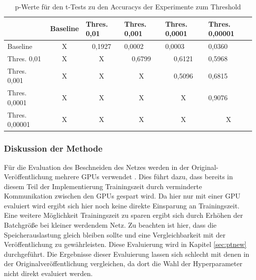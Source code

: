  \begin{table}[]
\caption{p-Werte für den t-Tests zu den Accuracys der Experimente zum Threshold}
\begin{tabular}{l|c|c|c|c|l|}
\cline{2-6}
                                     & \multicolumn{1}{l|}{Baseline} & \multicolumn{1}{l|}{Thres. 0,01} & \multicolumn{1}{l|}{Thres. 0,001} & \multicolumn{1}{l|}{Thres. 0,0001} & Thres. 0,00001                 \\ \hline
\multicolumn{1}{|l|}{Baseline}       & X                             & 0,1927                           & \multicolumn{1}{l|}{0,0002}       & \multicolumn{1}{l|}{0,0003}        & 0,0360                         \\ \hline
\multicolumn{1}{|l|}{Thres. 0,01}    & X                             & X                                & \cellcolor[HTML]{FE0000}0,6799    & \cellcolor[HTML]{FE0000}0,6121     & \cellcolor[HTML]{FE0000}0,5968 \\ \hline
\multicolumn{1}{|l|}{Thres. 0,001}   & X                             & X                                & X                                 & \cellcolor[HTML]{FE0000}0,5096     & \cellcolor[HTML]{FE0000}0,6815 \\ \hline
\multicolumn{1}{|l|}{Thres. 0,0001}  & X                             & X                                & X                                 & X                                  & \cellcolor[HTML]{FE0000}0,9076 \\ \hline
\multicolumn{1}{|l|}{Thres. 0,00001} & X                             & X                                & X                                 & X                                  & \multicolumn{1}{c|}{X}         \\ \hline
\end{tabular}
\label{tab:thres2}
\end{table}
\subsubsection{Diskussion der Methode}
Für die Evaluation des Beschneiden des Netzes werden in der Original-Veröffentlichung mehrere GPUs verwendet \cite{prunetrain}. Dies führt dazu, dass bereits in diesem Teil der Implementierung Trainingszeit durch verminderte Kommunikation zwischen den GPUs gespart wird. Da hier nur mit einer GPU evaluiert wird ergibt sich hier noch keine direkte Einsparung an Trainingszeit. Eine weitere Möglichkeit Trainingszeit zu sparen ergibt sich durch Erhöhen der Batchgröße bei kleiner werdendem Netz. Zu beachten ist hier, dass die Speicherauslastung gleich bleiben sollte und eine Vergleichbarkeit mit der Veröffentlichung zu gewährleisten. Diese Evaluierung wird in Kapitel \ref{sec:ptnew} durchgeführt.
Die Ergebnisse dieser Evaluierung lassen sich schlecht mit denen in der Originalveröffentlichung vergleichen, da dort die Wahl der Hyperparameter nicht direkt evaluiert werden.

